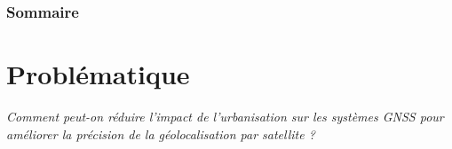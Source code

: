 \documentclass[xcolor=dvipsnames,envcountsect]{beamer}
\begin{document}
\begin{frame}{\frametitle{Sommaire}\tableofcontents}\end{frame}

\section{Problématique}
\begin{frame}
	\centering
	\begin{block}
		\scshape
			\begin{center}
				\Huge\emph{Comment peut-on réduire l'impact de l'urbanisation sur les systèmes GNSS pour améliorer la
				précision de la géolocalisation par satellite ?}
			\end{center}
	\end{block}
\end{frame}
\end{document}
